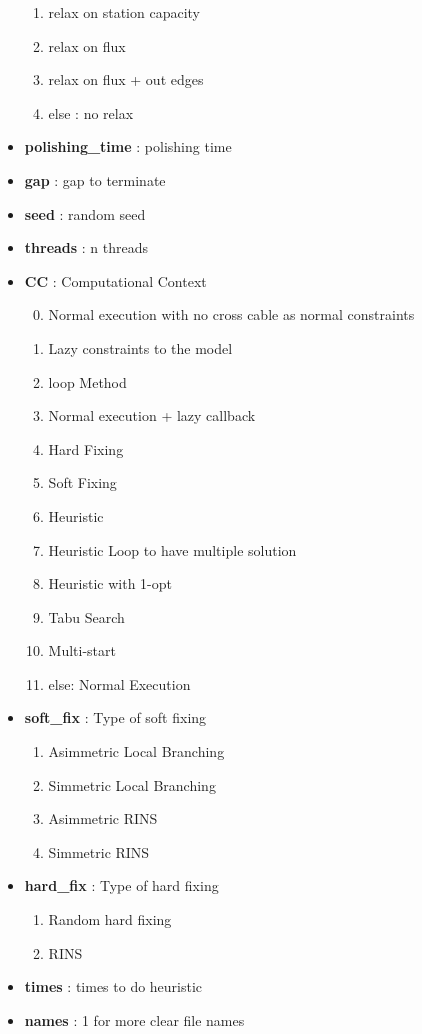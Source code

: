 \begin{appendices}
\begin{itemize}
\begin{enumerate}
	\item relax on station capacity
	\item relax on flux
	\item relax on flux + out edges
	\item[] else : no relax
\end{enumerate}
\item \textbf{polishing\_time} : polishing time
\item \textbf{gap} : gap to terminate
\item \textbf{seed} : random seed
\item \textbf{threads} : n threads
\item \textbf{CC} : Computational Context
\begin{enumerate}\setcounter{enumi}{-1}
\setlength{\parskip}{0pt}
\setlength{\itemsep}{0pt plus 1pt}
	\item Normal execution with no cross cable as normal constraints
	\item Lazy constraints to the model
	\item loop Method
	\item Normal execution + lazy callback
	\item Hard Fixing
	\item Soft Fixing
	\item Heuristic
	\item Heuristic Loop to have multiple solution
	\item Heuristic with 1-opt
	\item Tabu Search
	\item Multi-start
	\item[] else: Normal Execution
\end{enumerate}
\item \textbf{soft\_fix} : Type of soft fixing
\begin{enumerate}\setcounter{enumi}{0}
\setlength{\parskip}{0pt}
\setlength{\itemsep}{0pt plus 1pt}
	\item Asimmetric Local Branching
	\item Simmetric Local Branching
	\item Asimmetric RINS
	\item Simmetric RINS
\end{enumerate}
\item \textbf{hard\_fix} : Type of hard fixing
\begin{enumerate}\setcounter{enumi}{0}
\setlength{\parskip}{0pt}
\setlength{\itemsep}{0pt plus 1pt}
	\item Random hard fixing
	\item RINS
\end{enumerate}
\item \textbf{times} : times to do heuristic
\item \textbf{names} : 1 for more clear file names
\end{itemize}


\end{appendices}
